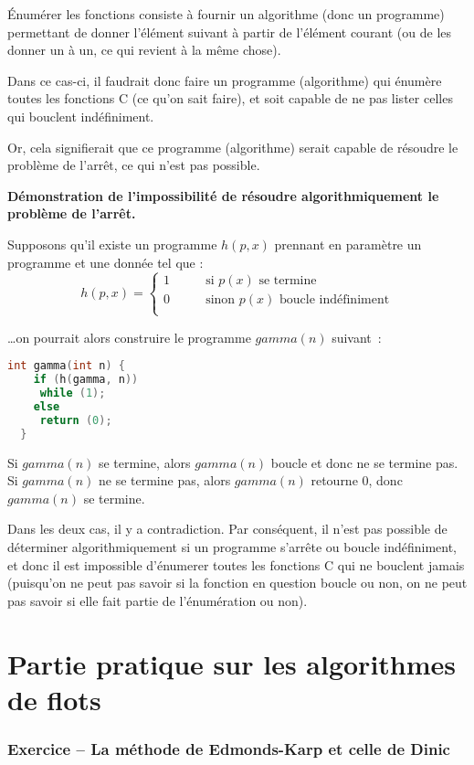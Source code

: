 \documentclass{article}
\newcounter{exocount}
\newcounter{enoncecount}
\begin{document}
Énumérer les fonctions consiste à fournir un algorithme (donc un programme) permettant de donner l'élément suivant à partir de l'élément courant (ou de les donner un à un, ce qui revient à la même chose).

Dans ce cas-ci, il faudrait donc faire un programme (algorithme) qui énumère toutes les fonctions C (ce qu'on sait faire), et soit capable de ne pas lister celles qui bouclent indéfiniment.

Or, cela signifierait que ce programme (algorithme) serait capable de résoudre le problème de l'arrêt, ce qui n'est pas possible.

\textbf{Démonstration de l'impossibilité de résoudre algorithmiquement le problème de l'arrêt.}

Supposons qu'il existe un programme $h(p, x)$ prennant en paramètre un programme et une donnée tel que :
\[
h(p, x) = \left\{
\begin{array}{ll}
  1 & \qquad \text{si $p(x)$ se termine} \\
  0 & \qquad \text{sinon $p(x)$ boucle indéfiniment} \\
\end{array}
\right.
\]

\ldots on pourrait alors construire le programme $gamma(n)$ suivant~:
\begin{lstlisting}[language=C]
  int gamma(int n) {
    if (h(gamma, n))
     while (1);
    else
     return (0);
  }
\end{lstlisting}
Si $gamma(n)$ se termine, alors $gamma(n)$ boucle et donc ne se termine pas. Si $gamma(n)$ ne se termine pas, alors $gamma(n)$ retourne 0,
donc $gamma(n)$ se termine.

Dans les deux cas, il y a contradiction. Par conséquent, il n'est pas possible de déterminer algorithmiquement si un programme s'arrête ou
boucle indéfiniment, et donc il est impossible d'énumerer toutes les fonctions C qui ne bouclent jamais (puisqu'on ne peut pas savoir si la
fonction en question boucle ou non, on ne peut pas savoir si elle fait partie de l'énumération ou non).

\section{Partie pratique sur les algorithmes de flots}


\subsubsection*{Exercice \bf\small {} -- La méthode de Edmonds-Karp et celle de Dinic}
\setcounter{enoncecount}{0}
\end{document}
